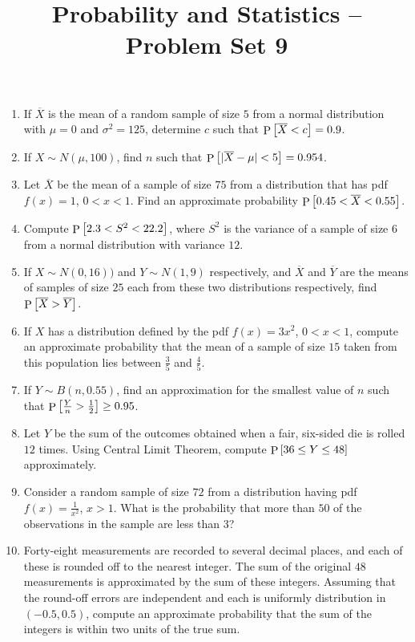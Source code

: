 \documentclass[svgnames]{amsart}
\title[]{Probability and Statistics -- Problem Set 9}
\DeclareMathOperator{\Prob}{P}
\begin{document}
\maketitle
\begin{enumerate}[leftmargin=*, itemsep=0.3em]
\item If $\overline X$ is the mean of a random sample of size $5$ from a normal distribution with $\mu = 0$ and $\sigma^2 = 125$, determine $c$ such that $\Prob\bqty{\overline X < c} = 0.9$.

\item If $X \sim N(\mu, 100)$, find $n$ such that $\Prob\bqty{|\overline X - \mu| < 5} = 0.954$.

\item Let $\overline X$ be the mean of a sample of size $75$ from a distribution that has pdf $f(x) = 1$, $0 < x < 1$. Find an approximate probability $\Prob\bqty{0.45 < \overline X < 0.55}$.

\item Compute $\Prob\bqty{2.3 < S^2 < 22.2}$, where $S^2$ is the variance of a sample of size $6$ from a normal distribution with variance $12$.

\item If $X \sim N(0, 16))$ and $Y \sim N(1, 9)$ respectively, and $\overline X$ and $\overline Y$ are the means of samples of size $25$ each from these two distributions respectively, find $\Prob\bqty{\overline X > \overline Y}$.

\item If $X$ has a distribution defined by the pdf $f(x) = 3x^2$, $0 < x < 1$, compute an approximate probability that the mean of a sample of size $15$ taken from this population lies between $\frac 3 5$ and $\frac 4 5$.

\item If $Y \sim B(n, 0.55)$, find an approximation for the smallest value of $n$ such that $\Prob\bqty{\frac Y n > \frac 1 2} \ge 0.95$.

\item Let $Y$ be the sum of the outcomes obtained when a fair, six-sided die is rolled $12$ times. Using Central Limit Theorem, compute $\Prob\bqty{36 \le Y \le 48}$ approximately.

\item Consider a random sample of size $72$ from a distribution having pdf $f(x) = \frac 1 {x^2}$, $x > 1$. What is the probability that more than $50$ of the observations in the sample are less than $3$?

\item Forty-eight measurements are recorded to several decimal places, and each of these is rounded off to the nearest integer. The sum of the original $48$ measurements is approximated by the sum of these integers. Assuming that the round-off errors are independent and each is uniformly distribution in $(-0.5, 0.5)$, compute an approximate probability that the sum of the integers is within two units of the true sum.


\end{enumerate}
\end{document}
